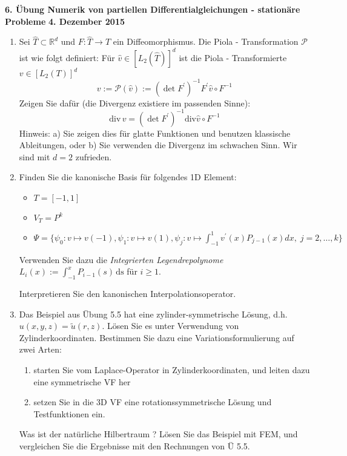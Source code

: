 \documentclass[11pt,a4paper]{report}
\newcommand{\R}[1]{\mathbb{R}^{#1}}
\begin{document}
\begin{center}
\textbf{6. \"Ubung Numerik von partiellen Differentialgleichungen - station\"are Probleme} \newline 
\textbf{4. Dezember 2015}
\end{center}
\begin{enumerate}
\item

Sei $\widehat T \subset \R{d}$ und $F : \widehat T \rightarrow T$ ein
Diffeomorphismus. Die Piola - Transformation ${\mathcal P}$ ist wie
folgt definiert: F\"ur $\hat v \in [L_2(\widehat T)]^d$ ist die Piola
- Transformierte $v \in [L_2(T)]^d$
$$
v := {\mathcal P} (\hat v) := (\det F^\prime)^{-1} F^\prime \hat v  \circ F^{-1}
$$
Zeigen Sie daf\"ur (die Divergenz existiere im passenden Sinne):
$$
\text{div} \, v =   (\det F^\prime)^{-1}  \text{div} \hat v \circ F^{-1}
$$
Hinweis: a) Sie zeigen dies f\"ur glatte Funktionen und
benutzen klassische Ableitungen, oder b) Sie verwenden die Divergenz im
schwachen Sinn. Wir sind mit $d = 2$ zufrieden.

\item
Finden Sie die kanonische Basis  f\"ur folgendes 1D Element: 
\begin{itemize}
\item $T = [-1,1]$
\item $V_T = P^k$
\item $\Psi = \{ \psi_0 : v \mapsto v(-1), \psi_1 : v \mapsto v(1),  \psi_j : v \mapsto \int_{-1}^1 v^\prime(x) P_{j-1}(x)  dx,  \; j = 2, \ldots, k \}$ 
\end {itemize}
Verwenden Sie dazu die {\em Integrierten Legendrepolynome} $L_i(x) :=
\int_{-1}^x P_{i-1}(s) \, \text{ds}$ f\"ur $i \geq 1$.

Interpretieren Sie den kanonischen Interpolationsoperator.


\item Das Beispiel aus \"Ubung 5.5 hat eine zylinder-symmetrische
  L\"osung, d.h. $u(x,y,z) = \tilde u(r,z)$.  L\"osen Sie es unter Verwendung von Zylinderkoordinaten.
Bestimmen Sie dazu eine Variationsformulierung auf zwei Arten:
\begin{enumerate}
\item starten Sie vom Laplace-Operator in Zylinderkoordinaten, und
  leiten dazu eine symmetrische VF her
\item setzen Sie in die 3D VF eine rotationssymmetrische L\"osung und
  Testfunktionen ein.
\end{enumerate}
Was ist der nat\"urliche Hilbertraum ?
L\"osen Sie das Beispiel mit FEM, und vergleichen Sie die Ergebnisse mit den Rechnungen von \"U 5.5.


\end{enumerate}
\end{document}

